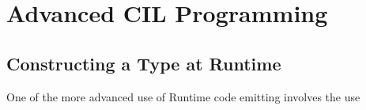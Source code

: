 \chapter{Advanced CIL Programming}
\section{Constructing a Type at Runtime}
One of the more advanced use of Runtime code emitting involves the use 